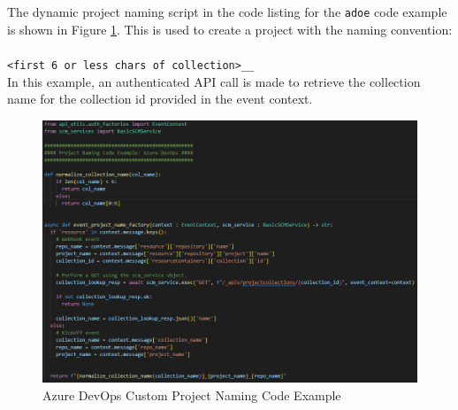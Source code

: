 The dynamic project naming script in the code listing for the \texttt{adoe}
code example is shown in Figure \ref{fig:naming-code-adoe}.  This is used to create a project with the naming convention:\\\\
\texttt{<first 6 or less chars of collection>\_<project name>\_<repo name>}\\

In this example, an authenticated API call is made to retrieve the collection name
for the collection id provided in the event context.

\begin{figure}[h]
    \includegraphics[width=\textwidth]{graphics/naming-code-adoe.png}
    \caption{Azure DevOps Custom Project Naming Code Example}
    \label{fig:naming-code-adoe}
\end{figure}

